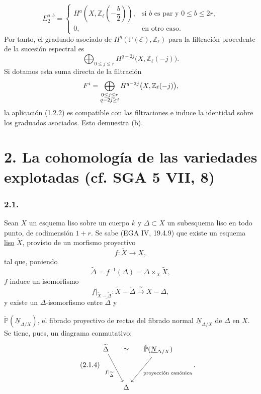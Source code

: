 \pageoriginale

\begin{equation}\tag{1.2.4}
E_2^{a,b}=
\begin{cases}
H^a\left(X,\mathbb Z_\ell\left(-\dfrac b2\right)\right),
  & \text{si $b$ es par y $0\leq b\leq2r$},\\[2ex]
0, & \text{en otro caso}.
\end{cases}
\end{equation}
Por tanto, el graduado asociado de
$H^q(\mathbb P(\mathcal E),\mathbb Z_\ell)$ para la filtración
procedente de la sucesión espectral es
\[
\bigoplus_{0\leq j\leq r}
H^{q-2j}\bigl(X,\mathbb Z_\ell(-j)\bigr).
\]
Si dotamos esta suma directa de la filtración
\[
F^i=
\bigoplus_{\substack{0\leq j\leq r\\q-2j\geq i}}
H^{q-2j}\bigl(X,\mathbb Z_\ell(-j)\bigr),
\]
la aplicación (1.2.2) es compatible con las filtraciones e induce la
identidad sobre los graduados asociados. Esto demuestra (b).

\section*{2. La cohomología de las variedades explotadas
(cf. SGA 5 VII, 8)}

\subsubsection*{2.1.}
Sean $X$ un esquema liso sobre un cuerpo $k$ y
$\Delta\subset X$ un subesquema liso en todo punto, de codimensión
$1+r$. Se sabe (EGA IV, 19.4.9) que existe un esquema
\underline{liso} $\widetilde X$, provisto de un morfismo proyectivo
\begin{equation}\tag{2.1.1}
f:\widetilde X\longrightarrow X,
\end{equation}
tal que, poniendo
\begin{equation}\tag{2.1.2}
\widetilde\Delta=f^{-1}(\Delta)
=\Delta\times_X\widetilde X,
\end{equation}
$f$ induce un isomorfismo
\begin{equation}\tag{2.1.3}
f|_{\widetilde X-\widetilde\Delta}:
\widetilde X-\widetilde\Delta
\xrightarrow{\ \sim\ }X-\Delta,
\end{equation}
y existe un $\Delta$-isomorfismo entre $\widetilde\Delta$ y

\pageoriginale

$\check{\mathbb P}(\underline N_{\Delta/X})$, el fibrado proyectivo de
rectas del fibrado normal $\underline N_{\Delta/X}$ de $\Delta$ en $X$.
Se tiene, pues, un diagrama conmutativo:
\begin{equation}\tag{2.1.4}
\begin{tikzcd}[row sep=huge,column sep=small]
\widetilde\Delta
  \arrow[rd,"f|_{\widetilde\Delta}"']
  & \simeq &
\check{\mathbb P}(\underline N_{\Delta/X})
  \arrow[ld,"\text{proyección canónica}"]\\
{} & \Delta & {}
\end{tikzcd}.
\end{equation}


